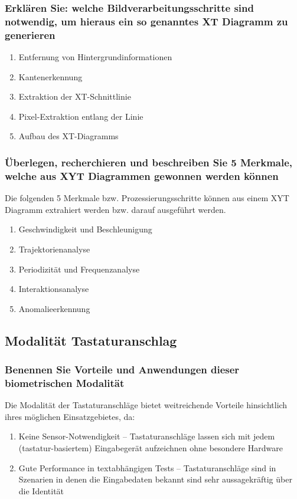 \documentclass{article}
\begin{document}
\subsubsection{Erklären Sie: welche Bildverarbeitungsschritte sind notwendig, um hieraus ein so genanntes XT Diagramm zu generieren}

\begin{enumerate}
	\item Entfernung von Hintergrundinformationen
	\item Kantenerkennung
	\item Extraktion der XT-Schnittlinie
	\item Pixel-Extraktion entlang der Linie
	\item Aufbau des XT-Diagramms
\end{enumerate}

\subsubsection{Überlegen, recherchieren und beschreiben Sie 5 Merkmale, welche aus XYT Diagrammen gewonnen werden können}

Die folgenden 5 Merkmale bzw. Prozessierungsschritte können aus einem XYT Diagramm extrahiert werden bzw. darauf 
ausgeführt werden.

\begin{enumerate}
	\item Geschwindigkeit und Beschleunigung
	\item Trajektorienanalyse
	\item Periodizität und Frequenzanalyse
	\item Interaktionsanalyse
	\item Anomalieerkennung
\end{enumerate}

\subsection{Modalität Tastaturanschlag}

\subsubsection{Benennen Sie Vorteile und Anwendungen dieser biometrischen Modalität}

Die Modalität der Tastaturanschläge bietet weitreichende Vorteile hinsichtlich ihres möglichen Einsatzgebietes, da:

\begin{enumerate}
	\item Keine Sensor-Notwendigkeit – Tastaturanschläge lassen sich mit jedem (tastatur-basiertem) Eingabegerät aufzeichnen ohne besondere Hardware
	\item Gute Performance in textabhängigen Tests – Tastaturanschläge sind in Szenarien in denen die Eingabedaten bekannt sind sehr aussagekräftig über die Identität
\end{enumerate}
\end{document}
